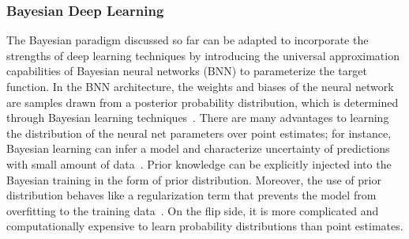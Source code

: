 \subsubsection{Bayesian Deep Learning}

The Bayesian paradigm discussed so far can be adapted to incorporate the
strengths of deep learning techniques by introducing the universal approximation
capabilities of Bayesian neural networks (BNN) to parameterize the target
function. In the BNN architecture, the weights and biases of the neural network
are samples drawn from a posterior probability distribution, which is determined
through Bayesian learning techniques~\cite{jospin2020hands}. 
%
There are many advantages to learning the distribution of the neural net
parameters over point estimates; for instance, Bayesian learning can infer a
model and characterize uncertainty of predictions with small amount of
data~\cite{jospin2020hands}. 
%
Prior knowledge can be explicitly injected into the Bayesian training in the form of 
prior distribution.
%
Moreover, the use of prior distribution behaves like a regularization term
that prevents the model from overfitting to the training
data~\cite{bishop2006pattern}. 
%
On the flip side, it is more complicated and computationally expensive to learn
probability distributions than point estimates.

